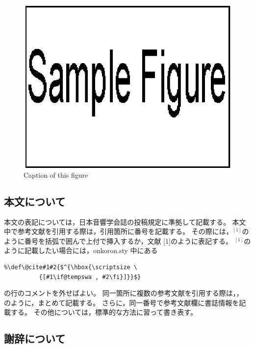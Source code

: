 \documentclass[10pt,twocolumn]{jarticle} %
\begin{document}
\begin{figure}[tb]
\begin{center}
\includegraphics[width=0.8\columnwidth]{sample.eps}
\vspace{-10pt}     %
\end{center}
\caption{Caption of this figure}
\label{fig:thatfigure}
\end{figure}
%
\subsection{本文について}

本文の表記については，日本音響学会誌の投稿規定に準拠して記載する。
本文中で参考文献を引用する際は，引用箇所に番号を記載する。
その際には，$^{[1]}$のように番号を括弧で囲んで上付で挿入するか，文献
[1]のように表記する。
$^{[1]}$のように記載したい場合には，onkoron.sty 中にある
\begin{verbatim}
%\def\@cite#1#2{$^{\hbox{\scriptsize \
          {[#1\if@tempswa , #2\fi}]}}$}
\end{verbatim}
の行のコメントを外せばよい。
同一箇所に複数の参考文献を引用する際は，\cite{article,sansho}，
\cite{article,book,taka,sato}のように，まとめて記載する。
さらに，同一番号で参考文献欄に書誌情報を記載する。
その他については，標準的な方法に習って書き表す\cite{sansho}。

\subsection{謝辞について}
\end{document}
